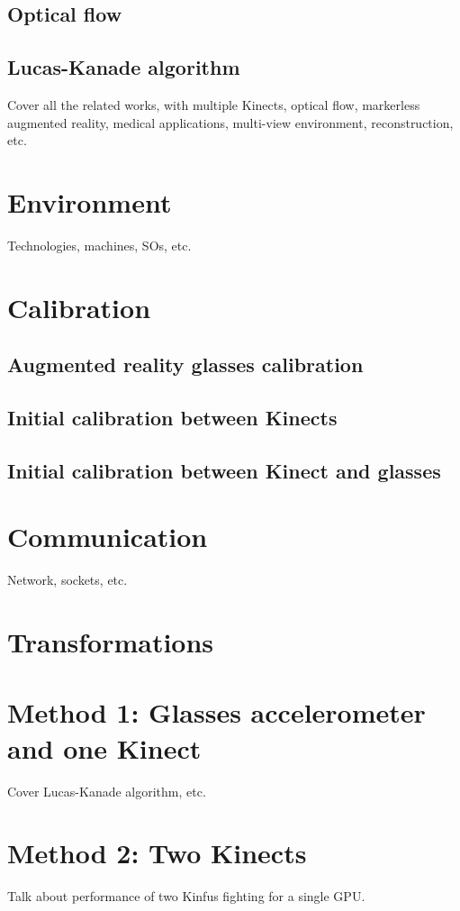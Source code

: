\documentclass[msc, a4paper, classic, en]{ufbathesis}
\begin{document}
\subsection{Optical flow}
\subsection{Lucas-Kanade algorithm}

Cover all the related works, with multiple Kinects, optical flow, markerless augmented reality, medical applications, multi-view environment, reconstruction, etc.

\section{Environment}
Technologies, machines, SOs, etc.
\section{Calibration}
\subsection{Augmented reality glasses calibration}
\subsection{Initial calibration between Kinects}
\subsection{Initial calibration between Kinect and glasses}
\section{Communication}
Network, sockets, etc.
\section{Transformations}
\section{Method 1: Glasses accelerometer and one Kinect}
Cover Lucas-Kanade algorithm, etc.
\section{Method 2: Two Kinects}
Talk about performance of two Kinfus fighting for a single GPU.
\end{document}
